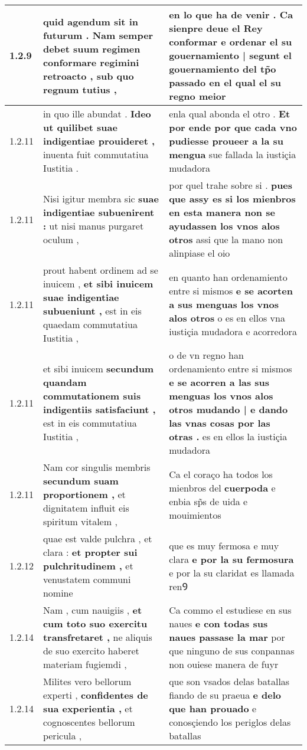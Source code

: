 \begin{tabular}{|p{1cm}|p{6.5cm}|p{6.5cm}|}
1.2.9 & quid agendum sit in futurum . \textbf{ Nam semper debet suum regimen conformare regimini retroacto , } sub quo regnum tutius , & en lo que ha de venir . \textbf{ Ca sienpre deue el Rey conformar e ordenar el su gouernamiento | segunt el gouernamiento del tp̃o passado } en el qual el su regno meior \\\hline
1.2.11 & in quo ille abundat . \textbf{ Ideo ut quilibet suae indigentiae prouideret , } inuenta fuit commutatiua Iustitia . & enla qual abonda el otro . \textbf{ Et por ende por que cada vno pudiesse proueer a la su mengua } sue fallada la iustiçia mudadora \\\hline
1.2.11 & Nisi igitur membra sic \textbf{ suae indigentiae subuenirent : } ut nisi manus purgaret oculum , & por quel trahe sobre si . \textbf{ pues que assy es si los mienbros en esta manera non se ayudassen los vnos alos otros } assi que la mano non alinpiase el oio \\\hline
1.2.11 & prout habent ordinem ad se inuicem , \textbf{ et sibi inuicem suae indigentiae subueniunt , } est in eis quaedam commutatiua Iustitia , & en quanto han ordenamiento entre si mismos \textbf{ e se acorten a sus menguas los vnos alos otros } o es en ellos vna iustiçia mudadora e acorredora \\\hline
1.2.11 & et sibi inuicem \textbf{ secundum quandam commutationem suis indigentiis satisfaciunt , } est in eis commutatiua Iustitia , & o de vn regno han ordenamiento entre si mismos \textbf{ e se acorren a las sus menguas los vnos alos otros mudando | e dando las vnas cosas por las otras . } es en ellos la iustiçia mudadora \\\hline
1.2.11 & Nam cor singulis membris \textbf{ secundum suam proportionem , } et dignitatem influit eis spiritum vitalem , & Ca el coraço ha todos los mienbros del \textbf{ cuerpoda } e enbia sp̃s de uida e mouimientos \\\hline
1.2.12 & quae est valde pulchra , et clara : \textbf{ et propter sui pulchritudinem , } et venustatem communi nomine & que es muy fermosa e muy clara \textbf{ e por la su fermosura } e por la su claridat es llamada renꝮ \\\hline
1.2.14 & Nam , cum nauigiis , \textbf{ et cum toto suo exercitu transfretaret , } ne aliquis de suo exercito haberet materiam fugiemdi , & Ca commo el estudiese en sus naues \textbf{ e con todas sus naues passase la mar } por que ninguno de sus conpannas non ouiese manera de fuyr \\\hline
1.2.14 & Milites vero bellorum experti , \textbf{ confidentes de sua experientia , } et cognoscentes bellorum pericula , & que son vsados delas batallas fiando de su praeua \textbf{ e delo que han prouado } e conosçiendo los periglos delas batallas \\\hline

\end{tabular}
